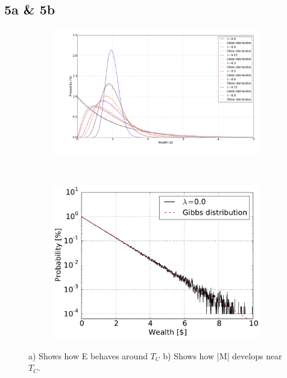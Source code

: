 \pagebreak
\subsection{5a \& 5b}
\begin{figure}[H]
    \centering
    \begin{subfigure}{0.5\textwidth}
        \centering
        \includegraphics[width=\linewidth]{result/bilder/5a}
        \caption{}
    \end{subfigure}%
    ~ 
    \begin{subfigure}{0.5\textwidth}
        \centering
        \includegraphics[width=\linewidth]{result/bilder/5b}
        \caption{}
    \end{subfigure}
    \caption{a) Shows how E behaves around $T_C$ b) Shows how |M| develops near $T_C$.}
    \label{fig:5a-b}
\end{figure}




























